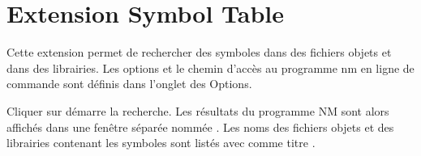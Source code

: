 \section{Extension Symbol Table}

Cette extension permet de rechercher des symboles dans des fichiers objets et dans des librairies. Les options et le chemin d'accès au programme nm en ligne de commande sont définis dans l'onglet des Options.


Cliquer sur  démarre la recherche. Les résultats du programme NM sont alors affichés dans une fenêtre séparée nommée . Les noms des fichiers objets et des librairies contenant les symboles sont listés avec comme titre .

